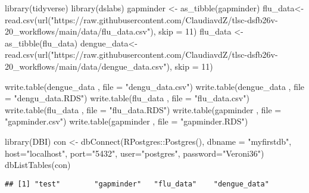 \documentclass[
]{book}
\newenvironment{Shaded}{\begin{snugshade}}{\end{snugshade}}
\newcommand{\AttributeTok}[1]{\textcolor[rgb]{0.77,0.63,0.00}{#1}}
\newcommand{\DecValTok}[1]{\textcolor[rgb]{0.00,0.00,0.81}{#1}}
\newcommand{\FunctionTok}[1]{\textcolor[rgb]{0.00,0.00,0.00}{#1}}
\newcommand{\NormalTok}[1]{#1}
\newcommand{\OtherTok}[1]{\textcolor[rgb]{0.56,0.35,0.01}{#1}}
\newcommand{\SpecialCharTok}[1]{\textcolor[rgb]{0.00,0.00,0.00}{#1}}
\newcommand{\StringTok}[1]{\textcolor[rgb]{0.31,0.60,0.02}{#1}}
\begin{document}
\begin{Shaded}
\begin{Highlighting}[]
\FunctionTok{library}\NormalTok{(tidyverse)}
\FunctionTok{library}\NormalTok{(dslabs)}
\NormalTok{gapminder }\OtherTok{\textless{}{-}} \FunctionTok{as\_tibble}\NormalTok{(gapminder)}
\NormalTok{flu\_data}\OtherTok{\textless{}{-}} \FunctionTok{read.csv}\NormalTok{(}\FunctionTok{url}\NormalTok{(}\StringTok{"https://raw.githubusercontent.com/ClaudiavdZ/tlsc{-}dsfb26v{-}20\_workflows/main/data/flu\_data.csv"}\NormalTok{), }\AttributeTok{skip =} \DecValTok{11}\NormalTok{)}
\NormalTok{flu\_data }\OtherTok{\textless{}{-}} \FunctionTok{as\_tibble}\NormalTok{(flu\_data)}
\NormalTok{dengue\_data}\OtherTok{\textless{}{-}} \FunctionTok{read.csv}\NormalTok{(}\FunctionTok{url}\NormalTok{(}\StringTok{"https://raw.githubusercontent.com/ClaudiavdZ/tlsc{-}dsfb26v{-}20\_workflows/main/data/dengue\_data.csv"}\NormalTok{), }\AttributeTok{skip =} \DecValTok{11}\NormalTok{)}

\FunctionTok{write.table}\NormalTok{(dengue\_data , }\AttributeTok{file =} \StringTok{"dengu\_data.csv"}\NormalTok{)}
\FunctionTok{write.table}\NormalTok{(dengue\_data , }\AttributeTok{file =} \StringTok{"dengu\_data.RDS"}\NormalTok{)}
\FunctionTok{write.table}\NormalTok{(flu\_data , }\AttributeTok{file =} \StringTok{"flu\_data.csv"}\NormalTok{)}
\FunctionTok{write.table}\NormalTok{(flu\_data , }\AttributeTok{file =} \StringTok{"flu\_data.RDS"}\NormalTok{)}
\FunctionTok{write.table}\NormalTok{(gapminder , }\AttributeTok{file =} \StringTok{"gapminder.csv"}\NormalTok{)}
\FunctionTok{write.table}\NormalTok{(gapminder , }\AttributeTok{file =} \StringTok{"gapminder.RDS"}\NormalTok{)}

\FunctionTok{library}\NormalTok{(DBI)}
\NormalTok{con }\OtherTok{\textless{}{-}} \FunctionTok{dbConnect}\NormalTok{(RPostgres}\SpecialCharTok{::}\FunctionTok{Postgres}\NormalTok{(), }
                 \AttributeTok{dbname =} \StringTok{"myfirstdb"}\NormalTok{, }
                 \AttributeTok{host=}\StringTok{"localhost"}\NormalTok{, }
                 \AttributeTok{port=}\StringTok{"5432"}\NormalTok{, }
                 \AttributeTok{user=}\StringTok{"postgres"}\NormalTok{, }
                 \AttributeTok{password=}\StringTok{"Veroni36"}\NormalTok{) }
\FunctionTok{dbListTables}\NormalTok{(con) }
\end{Highlighting}
\end{Shaded}

\begin{verbatim}
## [1] "test"        "gapminder"   "flu_data"    "dengue_data"
\end{verbatim}
\end{document}
